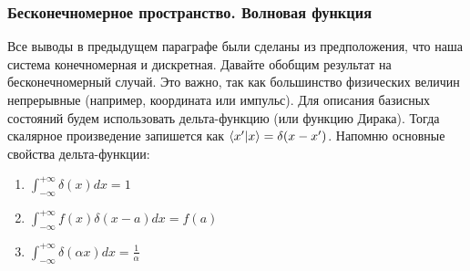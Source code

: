 \subsubsection*{Бесконечномерное пространство. Волновая функция}
\hspace{1em} Все выводы в предыдущем параграфе были сделаны из предположения, что наша система конечномерная и дискретная. Давайте обобщим результат на бесконечномерный случай. Это важно, так как большинство физических величин непрерывные (например, координата или импульс). Для описания базисных состояний будем использовать дельта-функцию (или функцию Дирака). Тогда скалярное произведение запишется как $\bra{x'}\ket{x} = \delta(x - x')$. Напомню основные свойства дельта-функции:
\begin{enumerate}
    \item $\int_{-\infty}^{+\infty}\delta(x)dx = 1$
    \item $\int^{+\infty}_{-\infty}f(x)\delta(x-a)dx = f(a)$
    \item $\int^{+\infty}_{-\infty}\delta(\alpha x)dx = \frac{1}{\alpha}$
\end{enumerate}

